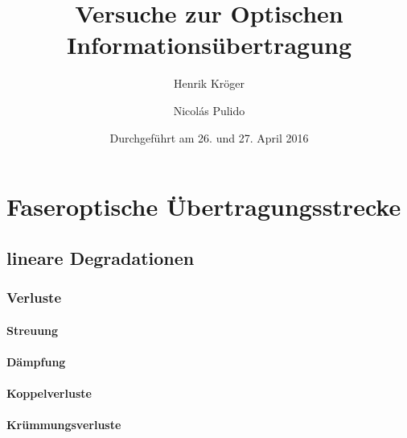 \documentclass[a4paper]{article}
\title{Versuche zur Optischen Informationsübertragung}
\author{Henrik Kröger \and Nicol\'as Pulido}
\date{Durchgeführt am 26. und 27. April 2016}
\begin{document}


\maketitle


\tableofcontents

\newpage
\section{Faseroptische Übertragungsstrecke}

\subsection{lineare Degradationen}

\subsubsection{Verluste}
\paragraph{Streuung}
\paragraph{Dämpfung}
\paragraph{Koppelverluste}
\paragraph{Krümmungsverluste}
\end{document}
